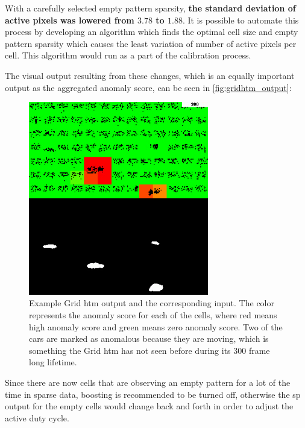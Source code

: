 With a carefully selected empty pattern sparsity, \textbf{the standard deviation of active pixels was lowered from $\mathbf{3.78}$ to $\mathbf{1.88}$}. It is possible to automate this process by developing an algorithm which finds the optimal cell size and empty pattern sparsity which causes the least variation of number of active pixels per cell. This algorithm would run as a part of the calibration process.\par
The visual output resulting from these changes, which is an equally important output as the aggregated anomaly score, can be seen in \autoref{fig:gridhtm_output}:
\begin{figure}[H]
    \centering
    \includegraphics[width=0.7\textwidth]{resources/methodology/htm_grid_output.png}
    \caption{Example Grid \gls*{htm} output and the corresponding input. The color represents the anomaly score for each of the cells, where red means high anomaly score and green means zero anomaly score. Two of the cars are marked as anomalous because they are moving, which is something the Grid \gls*{htm} has not seen before during its 300 frame long lifetime.}
    \label{fig:gridhtm_output}
\end{figure}
Since there are now cells that are observing an empty pattern for a lot of the time in sparse data, boosting is recommended to be turned off, otherwise the \gls*{sp} output for the empty cells would change back and forth in order to adjust the active duty cycle.
